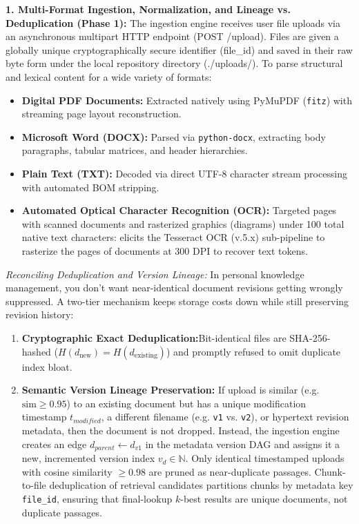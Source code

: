 \documentclass[a4paper,12pt]{article}
\begin{document}
\vspace{0.4em}
\noindent\textbf{1. Multi-Format Ingestion, Normalization, and Lineage vs. Deduplication (Phase 1):}
The ingestion engine receives user file uploads via an asynchronous multipart HTTP endpoint (POST /upload). Files are given a globally unique cryptographically secure identifier (file\_id) and saved in their raw byte form under the local repository directory (./uploads/). To parse structural and lexical content for a wide variety of formats:
\begin{itemize}
    \setlength{\itemsep}{1pt}
    \setlength{\parskip}{0pt}
    \item \textbf{Digital PDF Documents:} Extracted natively using PyMuPDF (\texttt{fitz}) with streaming page layout reconstruction.
    \item \textbf{Microsoft Word (DOCX):} Parsed via \texttt{python-docx}, extracting body paragraphs, tabular matrices, and header hierarchies.
    \item \textbf{Plain Text (TXT):} Decoded via direct UTF-8 character stream processing with automated BOM stripping.
    \item \textbf{Automated Optical Character Recognition (OCR):} Targeted pages with scanned documents and rasterized graphics (diagrams) under 100 total native text characters: elicits the Tesseract OCR (v.5.x) sub-pipeline to rasterize the pages of documents at 300 DPI to recover text tokens.
\end{itemize}
\textit{Reconciling Deduplication and Version Lineage:} In personal knowledge management, you don't want near-identical document revisions getting wrongly suppressed. A two-tier mechanism keeps storage costs down while still preserving revision history:
\begin{enumerate}
    \setlength{\itemsep}{1.5pt}
    \setlength{\parskip}{0pt}
    \item \textbf{Cryptographic Exact Deduplication:}Bit-identical files are SHA-256-hashed ($H(d_{\text{new}}) = H(d_{\text{existing}})$) and promptly refused to omit duplicate index bloat.
    \item \textbf{Semantic Version Lineage Preservation:} If upload is similar (e.g. $\text{sim} \ge 0.95$) to an existing document but has a unique modification timestamp $t_{modified}$, a different filename (e.g. \texttt{v1} vs. \texttt{v2}), or hypertext revision metadata, then the document is not dropped. Instead, the ingestion engine creates an edge $d_{parent} \leftarrow d_{v1}$ in the metadata version DAG and assigns it a new, incremented version index $v_d \in \mathbb{N}$. Only identical timestamped uploads with cosine similarity $\ge 0.98$ are pruned as near-duplicate passages. Chunk-to-file deduplication of retrieval candidates partitions chunks by metadata key \texttt{file\_id}, ensuring that final-lookup $k$-best results are unique documents, not duplicate passages.
\end{enumerate}
\end{document}
